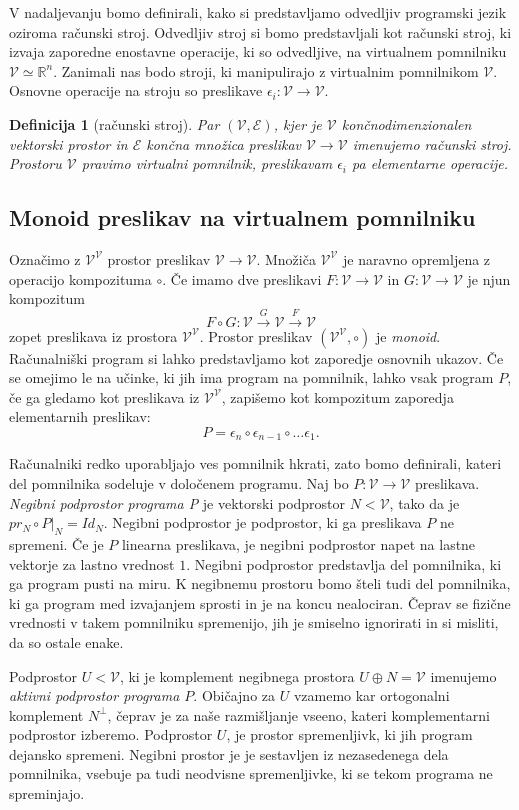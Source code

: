 \documentclass{article}
\newcommand{\RR}{\mathbb{R}}
\newcommand{\E}{\mathcal{E}}
\newcommand{\VV}{\mathcal{V}}
\newtheorem{definicija}{Definicija}[section]
\begin{document}
V nadaljevanju bomo definirali, kako si predstavljamo odvedljiv programski jezik
oziroma računski stroj. Odvedljiv stroj si bomo predstavljali kot računski
stroj, ki izvaja zaporedne enostavne operacije, ki so odvedljive, na virtualnem
pomnilniku $\VV\simeq\RR^n$. 
Zanimali nas bodo stroji, ki manipulirajo z virtualnim
pomnilnikom $\VV$. Osnovne operacije na stroju so preslikave 
$\epsilon_i:\VV\to \VV$.
\begin{definicija}[računski stroj]
  Par $(\VV,\E)$, kjer je $\VV$ končnodimenzionalen vektorski prostor in $\E$
  končna množica preslikav $\VV\to \VV$ imenujemo \emph{računski stroj}.
  Prostoru $\VV$ pravimo \emph{virtualni pomnilnik}, preslikavam $\epsilon_i$ pa
  \emph{elementarne operacije}.
\end{definicija}
\subsection{Monoid preslikav na virtualnem pomnilniku}
Označimo z $\VV^\VV$ prostor preslikav $\VV\to \VV$. Množiča $\VV^\VV$
je naravno opremljena z operacijo kompozituma $\circ$. Če imamo dve preslikavi
$F:\VV\to\VV$ in $G:\VV\to \VV$ je njun kompozitum 
$$F\circ G:\VV\xrightarrow{G} \VV\xrightarrow{F} \VV$$ 
zopet preslikava iz prostora
$\VV^\VV$. Prostor preslikav $(\VV^\VV, \circ)$ je \emph{monoid}. Računalniški
program si lahko predstavljamo kot zaporedje osnovnih ukazov. Če se omejimo le
na učinke, ki jih ima program na pomnilnik, lahko vsak program $P$, če ga
gledamo kot preslikava iz
$\VV^\VV$, zapišemo kot kompozitum zaporedja elementarnih preslikav: 
\[
P = \epsilon_n\circ\epsilon_{n-1}\circ \ldots \epsilon_1.
\]

Računalniki redko uporabljajo ves pomnilnik hkrati, zato bomo definirali, kateri
del pomnilnika sodeluje v določenem programu. Naj bo $P:\VV\to\VV$ preslikava.
\emph{Negibni podprostor programa P} je vektorski podprostor $N<\VV$, tako da
je $pr_N\circ P|_N=Id_N$. Negibni podprostor je podprostor, ki ga
preslikava $P$ ne spremeni. Če je $P$ linearna preslikava, je negibni podprostor
napet na lastne vektorje za lastno vrednost $1$. Negibni podprostor predstavlja
del pomnilnika, ki ga program pusti na miru. K negibnemu prostoru bomo šteli
tudi del pomnilnika, ki ga program med izvajanjem sprosti in je na koncu
nealociran. Čeprav se fizične vrednosti v takem pomnilniku spremenijo, jih je
smiselno ignorirati in si misliti, da so ostale enake.

Podprostor $U<\VV$, ki je komplement negibnega prostora $U\oplus
N=\VV$ imenujemo \emph{aktivni podprostor programa $P$}. Običajno za $U$ vzamemo
kar ortogonalni komplement $N^\perp$, čeprav je za naše
razmišljanje vseeno, kateri komplementarni podprostor izberemo. Podprostor $U$,
je prostor spremenljivk, ki jih program dejansko spremeni. Negibni prostor
je je sestavljen iz nezasedenega dela pomnilnika, vsebuje pa tudi neodvisne
spremenljivke, ki se tekom programa ne spreminjajo.
\end{document}

